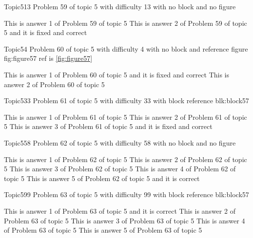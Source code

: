 \documentclass[master]{exam}
\begin{document}
\begin{problem}{Topic5}{13}
	Problem 59 of topic 5 with difficulty 13 with no block and no figure
	\begin{answers}
		\answer This is answer 1 of Problem 59 of topic 5 
		 This is answer 2 of Problem 59 of topic 5 and it is fixed and correct
	\end{answers}
\end{problem}

\begin{problem}{Topic5}{4}
	Problem 60 of topic 5 with difficulty 4 with no block and reference figure fig:figure57 ref is \ref{fig:figure57}
	\begin{answers}
		 This is answer 1 of Problem 60 of topic 5 and it is fixed and correct
		\answer This is answer 2 of Problem 60 of topic 5 
	\end{answers}
\end{problem}

\begin{problem}[requires=blk:block57]{Topic5}{33}
	Problem 61 of topic 5 with difficulty 33 with block reference blk:block57
	\begin{answers}
		\answer This is answer 1 of Problem 61 of topic 5 
		\answer This is answer 2 of Problem 61 of topic 5 
		 This is answer 3 of Problem 61 of topic 5 and it is fixed and correct
	\end{answers}
\end{problem}

\begin{problem}{Topic5}{58}
	Problem 62 of topic 5 with difficulty 58 with no block and no figure
	\begin{answers}
		\answer This is answer 1 of Problem 62 of topic 5 
		\answer This is answer 2 of Problem 62 of topic 5 
		\answer This is answer 3 of Problem 62 of topic 5 
		\answer This is answer 4 of Problem 62 of topic 5 
		\answer[correct] This is answer 5 of Problem 62 of topic 5 and it is correct
	\end{answers}
\end{problem}

\begin{problem}[requires=blk:block57]{Topic5}{99}
	Problem 63 of topic 5 with difficulty 99 with block reference blk:block57
	\begin{answers}
		\answer[correct] This is answer 1 of Problem 63 of topic 5 and it is correct
		\answer This is answer 2 of Problem 63 of topic 5 
		\answer This is answer 3 of Problem 63 of topic 5 
		\answer This is answer 4 of Problem 63 of topic 5 
		\answer This is answer 5 of Problem 63 of topic 5 
	\end{answers}
\end{problem}
\end{document}
